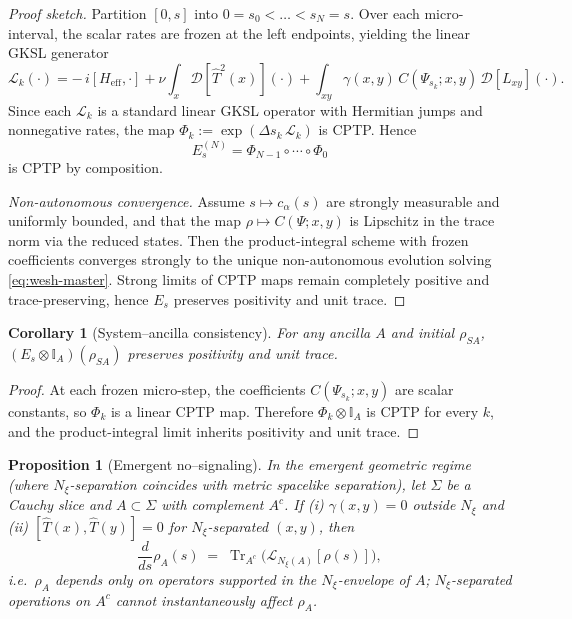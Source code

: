 \documentclass[12pt,a4paper]{article}
\newtheorem{proposition}{Proposition}[section]
\newtheorem{corollary}{Corollary}[section]
\renewcommand{\Tr}{\operatorname{Tr}}
\numberwithin{equation}{section}
\begin{document}
\begin{proof}[Proof sketch]
Partition $[0,s]$ into $0=s_0<\dots<s_N=s$. Over each micro-interval, the scalar rates are frozen at the left endpoints, yielding the linear GKSL generator
\[
\mathcal L_k(\cdot)=-\,i[H_{\mathrm{eff}},\cdot]+\nu\!\int_x\!\mathcal D[\hat T^2(x)](\cdot)
+\!\int_{xy}\gamma(x,y)\,C(\Psi_{s_k};x,y)\,\mathcal D[L_{xy}](\cdot).
\]
Since each $\mathcal L_k$ is a standard linear GKSL operator with Hermitian jumps and nonnegative rates, the map $\Phi_k:=\exp(\Delta s_k\,\mathcal L_k)$ is CPTP. Hence
\[
E_s^{(N)}=\Phi_{N-1}\circ\cdots\circ\Phi_0
\]
is CPTP by composition.

\noindent\textit{Non-autonomous convergence.}
Assume $s\mapsto c_\alpha(s)$ are strongly measurable and uniformly bounded, and that the map $\rho\mapsto C(\Psi;x,y)$ is Lipschitz in the trace norm via the reduced states. Then the product-integral scheme with frozen coefficients converges strongly to the unique non-autonomous evolution solving \eqref{eq:wesh-master}. Strong limits of CPTP maps remain completely positive and trace-preserving, hence $E_s$ preserves positivity and unit trace.
\end{proof}

\begin{corollary}[System–ancilla consistency]\label{cor:H-ancilla}
For any ancilla $A$ and initial $\rho_{SA}$, $(E_s\!\otimes\!\mathbb I_A)(\rho_{SA})$ preserves positivity and unit trace.
\end{corollary}

\begin{proof}
At each frozen micro-step, the coefficients $C(\Psi_{s_k};x,y)$ are scalar constants, so $\Phi_k$ is a linear CPTP map. Therefore $\Phi_k\!\otimes\!\mathbb I_A$ is CPTP for every $k$, and the product-integral limit inherits positivity and unit trace.
\end{proof}

\begin{proposition}[Emergent no–signaling]\label{prop:H-nosig}
In the emergent geometric regime (where $N_\xi$-separation coincides with metric spacelike separation), let $\Sigma$ be a Cauchy slice and $A\subset\Sigma$ with complement $A^c$. If (i) $\gamma(x,y)=0$ outside $N_\xi$ and (ii) $[\hat T(x),\hat T(y)]=0$ for $N_\xi$-separated $(x,y)$, then
\[
\frac{d}{ds}\rho_A(s)\;=\;\Tr_{A^c}\big(\mathcal L_{N_\xi(A)}[\rho(s)]\big),
\]
i.e.\ $\rho_A$ depends only on operators supported in the $N_\xi$-envelope of $A$; $N_\xi$-separated operations on $A^c$ cannot instantaneously affect $\rho_A$.
\end{proposition}
\end{document}
